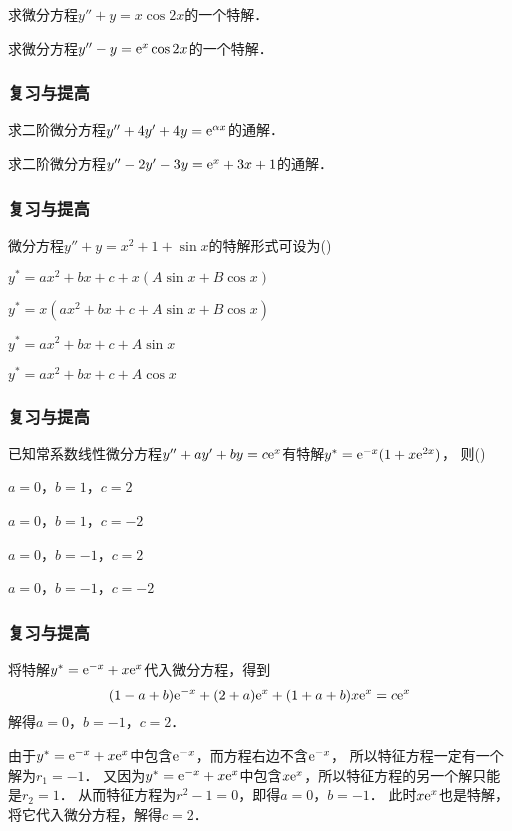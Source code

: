 \documentclass[14pt,notheorems,leqno,xcolor={rgb}]{beamer} %
\begin{document}
\begin{frame}
\begin{example}
求微分方程$y''+y=x\cos 2x$的一个特解．
\end{example}
\vpause
\begin{example}
求微分方程$y''-y=\mathrm{e}^{x}\cos 2x$的一个特解．
\end{example}
\end{frame}


\begin{frame}
\frametitle{复习与提高}
\begin{puzzle}
求二阶微分方程$y''+4y'+4y=\mathrm{e}^{\alpha x}$的通解．
\end{puzzle}
\vpause
\begin{puzzle}
求二阶微分方程$y''-2y'-3y=\mathrm{e}^x+3x+1$的通解．
\end{puzzle}
\end{frame}

\begin{frame}
\frametitle{复习与提高}
\begin{choice}
微分方程$y''+y=x^2+1+\sin x$的特解形式可设为\dotfill(\qquad)%
\begin{choiceline}
  \item $y^*=ax^2+bx+c+x(A\sin x+B\cos x)$
  \item $y^*=x(ax^2+bx+c+A\sin x+B\cos x)$
  \item $y^*=ax^2+bx+c+A\sin x$
  \item $y^*=ax^2+bx+c+A\cos x$
\end{choiceline}
\end{choice}
\end{frame}

\begin{frame}
\frametitle{复习与提高}
\begin{choice}
已知常系数线性微分方程$y''+ay'+by=c\mathrm{e}^x$有特解$y^*=\mathrm{e}^{-x}(1+x\mathrm{e}^{2x})$，
则\dotfill(\qquad)%
\begin{choiceline}
  \item $a=0$，$b=1$，$c=2$
  \item $a=0$，$b=1$，$c=-2$
  \item $a=0$，$b=-1$，$c=2$
  \item $a=0$，$b=-1$，$c=-2$
\end{choiceline}
\end{choice}
\end{frame}

\begin{sframe}
\frametitle{复习与提高}
\begin{method}
将特解$y^*=\mathrm{e}^{-x}+x\mathrm{e}^{x}$代入微分方程，得到
\[ (1-a+b)\mathrm{e}^{-x}+(2+a)\mathrm{e}^x+(1+a+b)x\mathrm{e}^x=c\mathrm{e}^x \]
解得$a=0$，$b=-1$，$c=2$．
\end{method}
\vpause
\begin{method}
由于$y^*=\mathrm{e}^{-x}+x\mathrm{e}^{x}$中包含$\mathrm{e}^{-x}$，而方程右边不含$\mathrm{e}^{-x}$，
所以特征方程一定有一个解为$r_1=-1$．\ppause
又因为$y^*=\mathrm{e}^{-x}+x\mathrm{e}^{x}$中包含$x\mathrm{e}^{x}$，所以特征方程的另一个解只能是$r_2=1$．\ppause
从而特征方程为$r^2-1=0$，即得$a=0$，$b=-1$．\ppause
此时$x\mathrm{e}^x$也是特解，将它代入微分方程，解得$c=2$．
\end{method}
\end{sframe}
\end{document}
